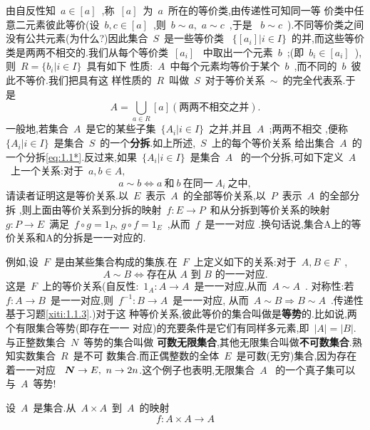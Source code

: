 由自反性知~$a \in [a]$~,称~$[a]$~为~$a$~所在的等价类,由传递性可知同一等
价类中任意二元素彼此等价(设~$b,c\in [a]$~,则~$b \sim a$,~$a \sim c$~,于是
~$b \sim c$~).不同等价类之间没有公共元素(为什么?)因此集合~$S$~是一些等价类
~$\{[a_i]|i \in I\}$~的并,而这些等价类是两两不相交的.我们从每个等价类~$[a_i]$~
中取出一个元素~$b$~;(即~$b_i \in [a_i]$~),则~$R=\{b_i|i \in I\}$~具有如下
性质:~$A$~中每个元素均等价于某个~$b$~,而不同的~$b$~彼此不等价.我们把具有这
样性质的~$R$~叫做~$S$~对于等价关系~$\sim$~的完全代表系.于是
\begin{equation}
    A=\bigcup_{a \in R}[a](\mbox{两两不相交之并}). \tag{$\ast$}\label{eq:1.1*}
\end{equation}
一般地,若集合~$A$~是它的某些子集~$\{A_i|i \in I\}$~之并,并且~$A$~;两两不相交
,便称~$\{A_i|i \in I\}$~是集合~$S$~的一个\textbf{分拆}.如上所述,~$S$~上的每个等价关系
给出集合~$A$~的一个分拆\eqref{eq:1.1*}.反过来,如果~$\{A_i|i \in I\}$~是集合~$A$~
的一个分拆,可如下定义~$A$~上一个关系:对于~$a,b \in A,$~
\begin{equation*}
    a \sim b \Leftrightarrow a~\mbox{和}~b~\mbox{在同一}~A_i~\mbox{之中},
\end{equation*}
请读者证明这是等价关系.以~$E$~表示~$A$~的全部等价关系,以~$P$~表示~$A$~的全部分拆
,则上面由等价关系到分拆的映射~$f:E \rightarrow P$~和从分拆到等价关系的映射
~$g:P \rightarrow E$~满足~$f \circ g=1_P,~g \circ f=1_E$~,从而~$f$~是一一对应
.换句话说,集合A上的等价关系和A的分拆是一一对应的.\par
例如,设~$F$~是由某些集合构成的集族.在~$F$~上定义如下的关系:对于~$A,B \in F$~,
\begin{equation*}
    A \sim B \Leftrightarrow \mbox{存在从~$A$~到~$B$~的一一对应}.
\end{equation*}
这是~$F$~上的等价关系(自反性:~$1_A:A \rightarrow A$~是一一对应,从而~$A \sim A$~.
对称性:若~$f:A \rightarrow B$~是一一对应,则~$f^{-1}:B \rightarrow A$~是一一对应,
从而~$A \sim B \Rightarrow B \sim A$~.传递性基于习题\ref{xiti:1.1.3}.)对于这
种等价关系,彼此等价的集合叫做是\textbf{等势}的.比如说,两个有限集合等势(即存在一一
对应)的充要条件是它们有同样多元素,即~$|A|=|B|$.与正整数集合~$N$~等势的集合叫做
\textbf{可数无限集合},其他无限集合叫做\textbf{不可数集合}.熟知实数集合~$R$~是不可
数集合.而正偶整数的全体~$E$~是可数(无穷)集合,因为存在着一一对应
~$\boldsymbol{N}\rightarrow E,~n \rightarrow 2n$.这个例子也表明,无限集合~$A$~
的一个真子集可以与~$A$~等势!\par
设~$A$~是集合.从~$A \times A$~到~$A$~的映射
\begin{equation*}
    f:A \times A \rightarrow A
\end{equation*}
